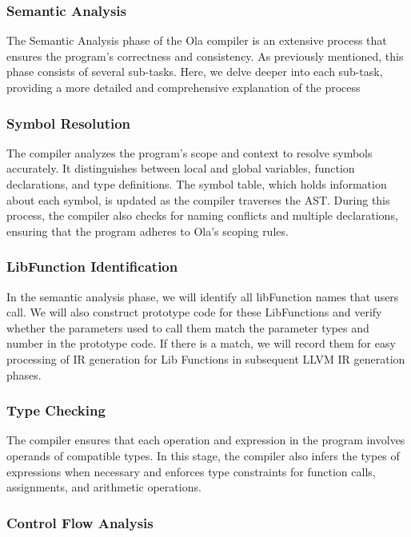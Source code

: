 
\subsubsection{Semantic Analysis}

The Semantic Analysis phase of the Ola compiler is an extensive process that ensures the program's correctness and consistency. As previously mentioned, this phase consists of several sub-tasks. Here, we delve deeper into each sub-task, providing a more detailed and comprehensive explanation of the process

\subsubsection*{Symbol Resolution}

The compiler analyzes the program's scope and context to resolve symbols accurately. It distinguishes between local and global variables, function declarations, and type definitions. The symbol table, which holds information about each symbol, is updated as the compiler traverses the AST. During this process, the compiler also checks for naming conflicts and multiple declarations, ensuring that the program adheres to Ola's scoping rules.

\subsubsection*{LibFunction Identification}

In the semantic analysis phase, we will identify all libFunction names that users call. We will also construct prototype code for these LibFunctions and verify whether the parameters used to call them match the parameter types and number in the prototype code. If there is a match, we will record them for easy processing of IR generation for Lib Functions in subsequent LLVM IR generation phases.

\subsubsection*{Type Checking}

The compiler ensures that each operation and expression in the program involves operands of compatible types. In this stage, the compiler also infers the types of expressions when necessary and enforces type constraints for function calls, assignments, and arithmetic operations.

\subsubsection*{Control Flow Analysis}

